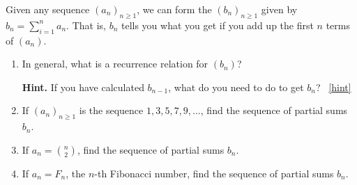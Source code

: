 \documentclass{book}
\begin{document}
\setcounter{project}{145}
\addtocounter{project}{-1}
\begin{activity}[]\label{activity-138}
\hypertarget{p-945}{}%
Given any sequence \((a_n)_{n \ge 1}\), we can form the  \((b_n)_{n \ge 1}\) given by \(b_n = \sum_{i = 1}^n a_n\).  That is, \(b_n\) tells you what you get if you add up the first \(n\) terms of \((a_n)\).%
\begin{enumerate}[font=\bfseries,label=(\alph*),ref=\alph*]
\item\label{task-175} \hypertarget{p-946}{}%
In general, what is a recurrence relation for \((b_n)\)?%
\par\smallskip%
\noindent\textbf{Hint.}\hypertarget{hint-104}{}\quad%
\hypertarget{p-947}{}%
If you have calculated \(b_{n-1}\), what do you need to do to get \(b_n\)?%
~\hfill{\tiny\hyperlink{a-145.a}{[hint]}\hypertarget{q-145.a}{}}\item\label{task-176} \hypertarget{p-948}{}%
If \((a_n)_{n \ge 1}\) is the sequence \(1, 3, 5, 7, 9, \ldots\), find the sequence of partial sums \(b_n\).%
\item\label{task-177} \hypertarget{p-949}{}%
If \(a_n = \binom{n}{2}\), find the sequence of partial sums \(b_n\).%
\item\label{task-178} \hypertarget{p-950}{}%
If \(a_n = F_n\), the \(n\)-th Fibonacci number, find the sequence of partial sums \(b_n\).%
\end{enumerate}
\end{activity}

\clearpage
\end{document}
